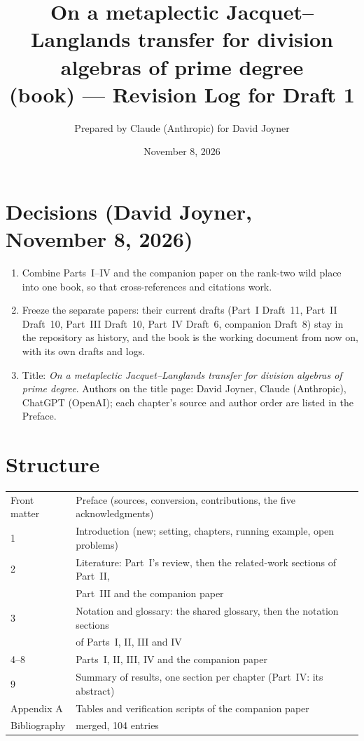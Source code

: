 \documentclass[11pt]{article}
\title{On a metaplectic Jacquet--Langlands transfer for division algebras of prime degree\\
(book) --- Revision Log for Draft 1}
\author{Prepared by Claude (Anthropic) for David Joyner}
\date{November 8, 2026}
\begin{document}
\maketitle

\section*{Decisions (David Joyner, November 8, 2026)}
\begin{enumerate}[leftmargin=*]
\item Combine Parts~I--IV and the companion paper on the rank-two wild
place into one book, so that cross-references and citations work.
\item Freeze the separate papers: their current drafts (Part~I
Draft~11, Part~II Draft~10, Part~III Draft~10, Part~IV Draft~6,
companion Draft~8) stay in the repository as history, and the book is
the working document from now on, with its own drafts and logs.
\item Title: \emph{On a metaplectic Jacquet--Langlands transfer for
division algebras of prime degree}.  Authors on the title page:
David Joyner, Claude (Anthropic), ChatGPT (OpenAI); each chapter's
source and author order are listed in the Preface.
\end{enumerate}

\section*{Structure}
\begin{tabular}{@{}ll@{}}\toprule
Front matter & Preface (sources, conversion, contributions, the five acknowledgments)\\
1 & Introduction (new; setting, chapters, running example, open problems)\\
2 & Literature: Part~I's review, then the related-work sections of Part~II,\\
  & Part~III and the companion paper\\
3 & Notation and glossary: the shared glossary, then the notation sections\\
  & of Parts~I, II, III and IV\\
4--8 & Parts~I, II, III, IV and the companion paper\\
9 & Summary of results, one section per chapter (Part~IV: its abstract)\\
Appendix A & Tables and verification scripts of the companion paper\\
Bibliography & merged, 104 entries\\
\bottomrule\end{tabular}
\end{document}
